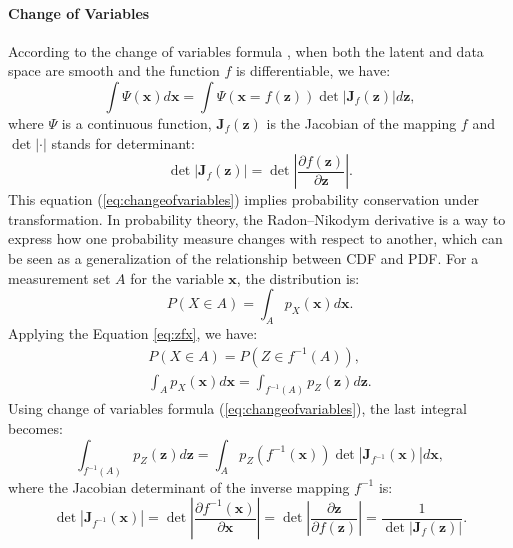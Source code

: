 \paragraph{Change of Variables}
According to the change of variables formula \citep{changeofvariables}, when both the latent and data space are smooth and the function $f$ is differentiable, we have:
\begin{equation}
    \label{eq:changeofvariables}
    \int \varPsi(\boldsymbol{x}) d\boldsymbol{x} = \int \varPsi(\boldsymbol{x}=f(\boldsymbol{z}))\det\left|\boldsymbol{J}_f(\boldsymbol{z})\right| d\boldsymbol{z},
\end{equation}
where $\varPsi$ is a continuous function, $\boldsymbol{J}_f(\boldsymbol{z})$ is the Jacobian of the mapping $f$ and $\det|\cdot|$ stands for determinant:
\begin{equation}
    \det\left|\boldsymbol{J}_f(\boldsymbol{z})\right|=\det\left|\frac{\partial f(\boldsymbol{z})}{\partial\boldsymbol{z}}\right|.
\end{equation}
This equation (\ref{eq:changeofvariables}) implies probability conservation under transformation. In probability theory, the Radon–Nikodym derivative \citep{DU04} is a way to express how one probability measure changes with respect to another, which can be seen as a generalization of the relationship between \ac{CDF} and \ac{PDF}.
For a measurement set $A$ for the variable $\boldsymbol{x}$, the distribution is:
\begin{equation}
    P(X\in A)=\int_A p_X(\boldsymbol{x})d\boldsymbol{x}.
\end{equation}
Applying the Equation \ref{eq:zfx}, we have:
\begin{subequations}
    \begin{gather}
        P(X\in A)=P(Z\in f^{-1}(A)),\\
        \label{eq:intx}
        \int_A p_X(\boldsymbol{x})d\boldsymbol{x}=\int_{f^{-1}(A)}p_Z(\boldsymbol{z})d\boldsymbol{z}.
    \end{gather}
\end{subequations}
Using change of variables formula (\ref{eq:changeofvariables}), the last integral becomes:
\begin{equation}
    \label{eq:intz}
    \int_{f^{-1}(A)}p_Z(\boldsymbol{z})d\boldsymbol{z}=\int_A p_Z(f^{-1}(\boldsymbol{x}))\det\left|\boldsymbol{J}_{f^{-1}}(\boldsymbol{x})\right|d\boldsymbol{x},
\end{equation}
where the Jacobian determinant of the inverse mapping $f^{-1}$ is:
\begin{equation}
    \det\left|\boldsymbol{J}_{f^{-1}}(\boldsymbol{x})\right|=\det\left|\frac{\partial f^{-1}(\boldsymbol{x})}{\partial\boldsymbol{x}}\right|=\det\left|\frac{\partial\boldsymbol{z}}{\partial f(\boldsymbol{z})}\right|=\frac{1}{\det\left|\boldsymbol{J}_f(\boldsymbol{z})\right|}.
\end{equation}
